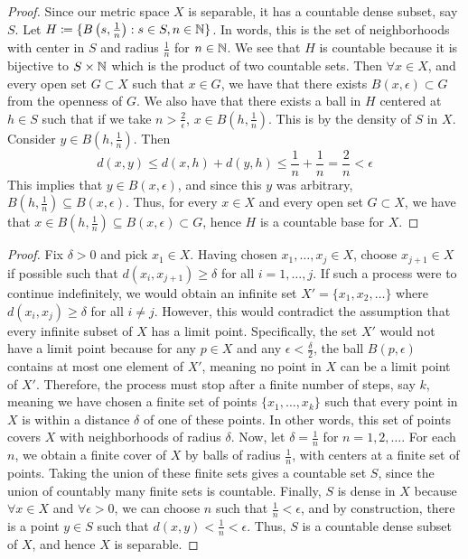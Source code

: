\documentclass[12pt]{article}
\begin{document}
\begin{exercise}{23}
    \begin{proof}
        Since our metric space $X$ is separable, it has a countable dense subset, say $S$. Let $H \coloneqq \{ B \left( s, \frac{1}{n} \right) : s \in S, n \in \mathbb{N} \}$. In words, this is the set of neighborhoods with center in $S$ and radius $\frac{1}{n}$ for $n \in \mathbb{N}$. We see that $H$ is countable because it is bijective to $S \times \mathbb{N}$ which is the product of two countable sets. Then $\forall x \in X$, and every open set $G \subset X$ such that $x \in G$, we have that there exists $B(x, \epsilon) \subset G$ from the openness of $G$. We also have that there exists a ball in $H$ centered at $h \in S$ such that if we take $n > \frac{2}{\epsilon}$, $x \in B(h, \frac{1}{n})$. This is by the density of $S$ in $X$. Consider $y \in B(h, \frac{1}{n})$. Then $$d(x, y) \le d(x, h) + d(y, h) \le \frac{1}{n} + \frac{1}{n} = \frac{2}{n} < \epsilon$$ This implies that $y \in B(x, \epsilon)$, and since this $y$ was arbitrary, $B(h, \frac{1}{n}) \subseteq B(x, \epsilon)$. Thus, for every $x \in X$ and every open set $G \subset X$, we have that $x \in B(h, \frac{1}{n}) \subseteq B(x, \epsilon) \subset G$, hence $H$ is a countable base for $X$. 
    \end{proof}
\end{exercise}

\begin{exercise}{24}
    \begin{proof} 
        Fix \(\delta > 0\) and pick \(x_1 \in X\). Having chosen \(x_1, \dots, x_j \in X\), choose \(x_{j + 1} \in X\) if possible such that \(d(x_i, x_{j + 1}) \ge \delta\) for all \(i = 1, \dots, j\). If such a process were to continue indefinitely, we would obtain an infinite set \(X' = \{x_1, x_2, \dots\}\) where \(d(x_i, x_j) \ge \delta\) for all \(i \neq j\). However, this would contradict the assumption that every infinite subset of \(X\) has a limit point. Specifically, the set \(X'\) would not have a limit point because for any \(p \in X\) and any \(\epsilon < \frac{\delta}{2}\), the ball \(B(p, \epsilon)\) contains at most one element of \(X'\), meaning no point in \(X\) can be a limit point of \(X'\). Therefore, the process must stop after a finite number of steps, say \(k\), meaning we have chosen a finite set of points \(\{x_1, \dots, x_k\}\) such that every point in $X$ is within a distance $\delta$ of one of these points. In other words, this set of points covers $X$ with neighborhoods of radius $\delta$. Now, let \(\delta = \frac{1}{n}\) for \(n = 1, 2, \dots\). For each \(n\), we obtain a finite cover of \(X\) by balls of radius \(\frac{1}{n}\), with centers at a finite set of points. Taking the union of these finite sets gives a countable set \(S\), since the union of countably many finite sets is countable. Finally, \(S\) is dense in \(X\) because \(\forall x \in X\) and \(\forall \epsilon > 0\), we can choose \(n\) such that \(\frac{1}{n} < \epsilon\), and by construction, there is a point \(y \in S\) such that \(d(x, y) < \frac{1}{n} < \epsilon\). Thus, \(S\) is a countable dense subset of \(X\), and hence \(X\) is separable. 
    \end{proof}
\end{exercise}
\end{document}

